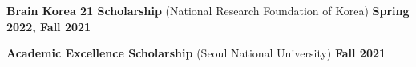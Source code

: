 \vspace*{10pt}
\textbf{Brain Korea 21 Scholarship} (National Research Foundation of Korea) \hfill \textbf{Spring 2022, Fall 2021}

\vspace*{6pt}
\textbf{Academic Excellence Scholarship} (Seoul National University) \hfill \textbf{Fall 2021}








